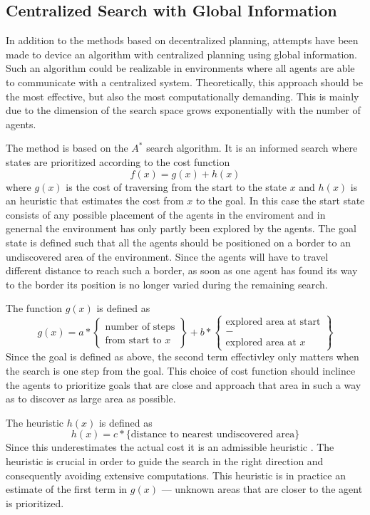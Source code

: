 \documentclass{article}
\begin{document}
\subsection{Centralized Search with Global Information}
In addition to the methods based on decentralized planning, attempts have been
made to device an algorithm with centralized planning using global information.
Such an algorithm could be realizable in environments where all agents are able
to communicate with a centralized system. Theoretically, this approach should
be the most effective, but also the most computationally demanding. This is
mainly due to the dimension of the search space grows exponentially with the
number of agents.

The method is based on the $A^*$ search algorithm. It is an informed search
where states are prioritized according to the cost function
%
$$f(x) = g(x) + h(x)$$
%
where $g(x)$ is the cost of traversing from the start to the state $x$ and
$h(x)$ is an heuristic that estimates the cost from $x$ to the goal. In this
case the start state consists of any possible placement of the agents in the
enviroment and in genernal the environment has only partly been explored by the
agents. The goal state is defined such that all the agents should be positioned
on a border to an undiscovered area of the environment. Since the agents will
have to travel different distance to reach such a border, as soon as one agent 
has found its way to the border its position is no longer varied during the 
remaining search.

The function $g(x)$ is defined as
%
$$g(x) = a * \begin{Bmatrix} \text{number of steps} \\ \text{from start to $x$}
\end{Bmatrix} + b * \begin{Bmatrix} \text{explored area at start} \\ - \\ \text{
explored area at $x$} \end{Bmatrix}$$
%
Since the goal is defined as above, the second term effectivley only matters
when the search is one step from the goal. This choice of cost function should
inclince the agents to prioritize goals that are close and approach that area in
such a way as to discover as large area as possible.

The heuristic $h(x)$ is defined as 
%
$$h(x) = c * \text{\{distance to nearest undiscovered area\} }$$
%
Since this underestimates the actual cost it is an admissible heuristic 
\cite{russell2003artificial}. The heuristic is crucial in order to guide the 
search in the right direction and consequently avoiding extensive computations.
This heuristic is in practice an estimate of the first term in $g(x)$ ---
unknown areas that are closer to the agent is prioritized.
\end{document}
